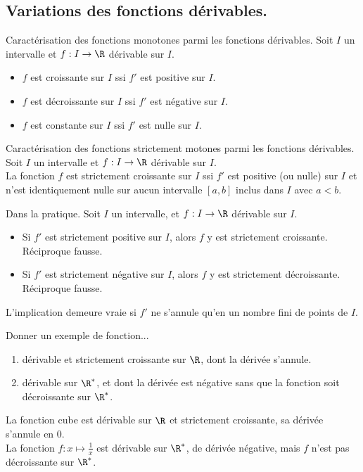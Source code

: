 \documentclass[11pt]{article}
\begin{document}
\subsection{Variations des fonctions dérivables.}

\begin{thm}{Caractérisation des fonctions monotones parmi les fonctions dérivables.}{}
    Soit $I$ un intervalle et $f:I\to\R$ dérivable sur $I$.
    \begin{itemize}
        \item $f$ est croissante sur $I$ ssi $f'$ est positive sur $I$.
        \item $f$ est décroissante sur $I$ ssi $f'$ est négative sur $I$.
        \item $f$ est constante sur $I$ ssi $f'$ est nulle sur $I$.
    \end{itemize}
\end{thm}

\begin{prop}{Caractérisation des fonctions strictement motones parmi les fonctions dérivables.}{}
    Soit $I$ un intervalle et $f:I\to\R$ dérivable sur $I$.\\
    La fonction $f$ est strictement croissante sur $I$ ssi $f'$ est positive (ou nulle) sur $I$ et n'est identiquement nulle sur aucun intervalle $[a,b]$ inclus dans $I$ avec $a<b$.
\end{prop}

\begin{corr}{Dans la pratique.}{}
    Soit $I$ un intervalle, et $f:I\to\R$ dérivable sur $I$.
    \begin{itemize}
        \item Si $f'$ est strictement positive sur $I$, alors $f$ y est strictement croissante. Réciproque fausse.
        \item Si $f'$ est strictement négative sur $I$, alors $f$ y est strictement décroissante. Réciproque fausse.
    \end{itemize}
    L'implication demeure vraie si $f'$ ne s'annule qu'en un nombre fini de points de $I$.
\end{corr}

\begin{ex}{}{}
    Donner un exemple de fonction...
    \begin{enumerate}
        \item dérivable et strictement croissante sur $\R$, dont la dérivée s'annule.
        \item dérivable sur $\R^*$, et dont la dérivée est négative sans que la fonction soit décroissante sur $\R^*$.
    \end{enumerate}
    \tcblower
     La fonction cube est dérivable sur $\R$ et strictement croissante, sa dérivée s'annule en 0.\\
     La fonction $f:x\mapsto\frac{1}{x}$ est dérivable sur $\R^*$, de dérivée négative, mais $f$ n'est pas décroissante sur $\R^*$.
\end{ex}
\end{document}
